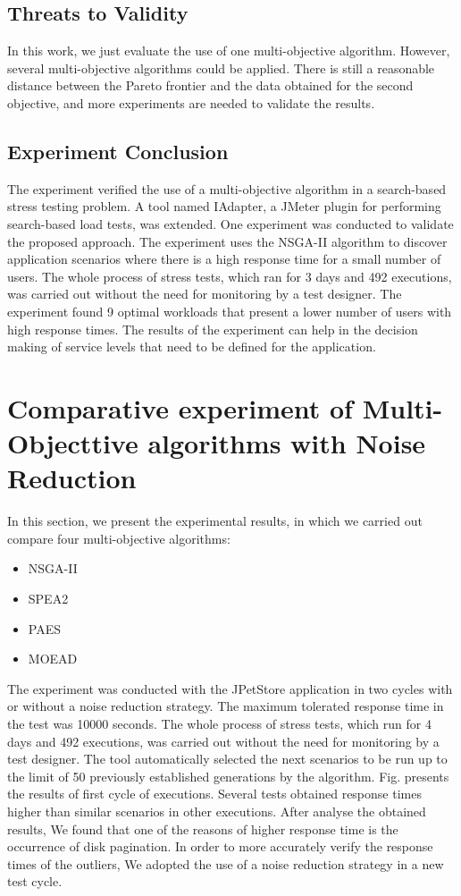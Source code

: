 \documentclass[espaco=umemeio,chapter=TITLE,twoside,openright]{abnt}
\begin{document}
\subsection{Threats to Validity}

In this work, we just evaluate the use of one multi-objective algorithm. However, several multi-objective algorithms could be applied.  There is still a reasonable distance between the Pareto frontier and the data obtained for the second objective, and more experiments are needed to validate the results.

\subsection{Experiment Conclusion}


The experiment verified the use of a multi-objective algorithm in a search-based stress testing problem. A tool named IAdapter, a JMeter plugin for performing search-based load tests, was extended.  One experiment was conducted to validate the proposed approach. The experiment uses the NSGA-II algorithm to discover application scenarios where there is a high response time for a small number of users. The whole process of stress  tests, which ran for 3 days and 492 executions, was carried out without the need for monitoring by a test designer.  The experiment found 9 optimal workloads that present a lower number of users with high response times. The results of the experiment can help in the decision making of service levels that need to be defined for the application.

\section{Comparative experiment of Multi-Objecttive algorithms with Noise Reduction}


In this section,  we present the experimental results,  in which we carried out compare four multi-objective algorithms:

\begin{itemize}
\item NSGA-II
\item SPEA2
\item PAES
\item MOEAD
\end{itemize}

The experiment was conducted with the JPetStore application in two cycles with or without a noise reduction strategy. The maximum tolerated response time in the test was 10000 seconds.  The whole process of stress  tests, which run for 4 days and 492 executions, was carried out without the need for monitoring by a test designer. The tool automatically selected the next scenarios to be run up to the limit of 50 previously established  generations by the algorithm. Fig. presents the results of first cycle of executions. Several tests obtained response times higher than similar scenarios in other executions. After analyse the obtained results, We found that one of the reasons of higher response time is the occurrence of disk pagination. In order to more accurately verify the response times of the outliers, We adopted the use of a noise reduction strategy in a new test cycle.
\end{document}
